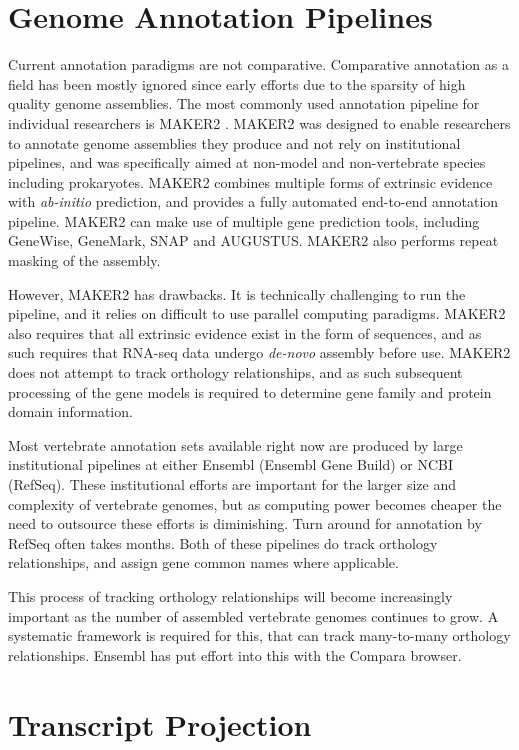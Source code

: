 \documentclass[fleqn,10pt]{wlscirep}
\begin{document}
\section{Genome Annotation Pipelines}
Current annotation paradigms are not comparative. Comparative annotation as a field has been mostly ignored since early efforts due to the sparsity of high quality genome assemblies. The most commonly used annotation pipeline for individual researchers is MAKER2 \cite{cantarel2008maker}. MAKER2 was designed to enable researchers to annotate genome assemblies they produce and not rely on institutional pipelines, and was specifically aimed at non-model and non-vertebrate species including prokaryotes. MAKER2 combines multiple forms of extrinsic evidence with \textit{ab-initio} prediction, and provides a fully automated end-to-end annotation pipeline. MAKER2 can make use of multiple gene prediction tools, including GeneWise, GeneMark, SNAP and AUGUSTUS. MAKER2 also performs repeat masking of the assembly.

However, MAKER2 has drawbacks. It is technically challenging to run the pipeline, and it relies on difficult to use parallel computing paradigms. MAKER2 also requires that all extrinsic evidence exist in the form of sequences, and as such requires that RNA-seq data undergo \textit{de-novo} assembly before use. MAKER2 does not attempt to track orthology relationships, and as such subsequent processing of the gene models is required to determine gene family and protein domain information.

Most vertebrate annotation sets available right now are produced by large institutional pipelines at either Ensembl (Ensembl Gene Build) or NCBI (RefSeq). These institutional efforts are important for the larger size and complexity of vertebrate genomes, but as computing power becomes cheaper the need to outsource these efforts is diminishing. Turn around for annotation by RefSeq often takes months. Both of these pipelines do track orthology relationships, and assign gene common names where applicable.

This process of tracking orthology relationships will become increasingly important as the number of assembled vertebrate genomes continues to grow. A systematic framework is required for this, that can track many-to-many orthology relationships. Ensembl has put effort into this with the Compara browser\cite{vilella2009ensemblcompara}.

\section{Transcript Projection}
\end{document}
